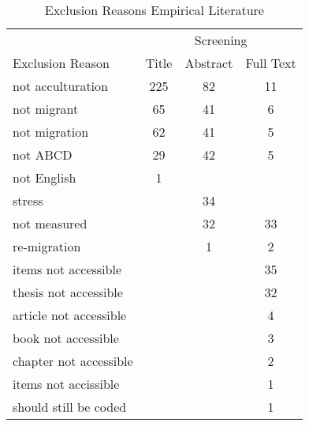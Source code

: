 \begin{table}
\begin{minipage}[t][\textheight][t]{\textwidth}

\caption{\label{tab:EmpiricalExclusion}Exclusion Reasons Empirical Literature}
\begin{tabular}[t]{lccc}
\toprule
\multicolumn{1}{c}{ } & \multicolumn{3}{c}{Screening} \\
\cmidrule(l{3pt}r{3pt}){2-4}
Exclusion Reason & Title & Abstract & Full Text\\
\midrule
not acculturation & 225 & 82 & 11\\
not migrant & 65 & 41 & 6\\
not migration & 62 & 41 & 5\\
not ABCD & 29 & 42 & 5\\
not English & 1 &  & \\
stress &  & 34 & \\
not measured &  & 32 & 33\\
re-migration &  & 1 & 2\\
items not accessible &  &  & 35\\
thesis not accessible &  &  & 32\\
article not accessible &  &  & 4\\
book not accessible &  &  & 3\\
chapter not accessible &  &  & 2\\
items not accissible &  &  & 1\\
should still be coded &  &  & 1\\
\bottomrule
\end{tabular}
\end{minipage}
\end{table}
